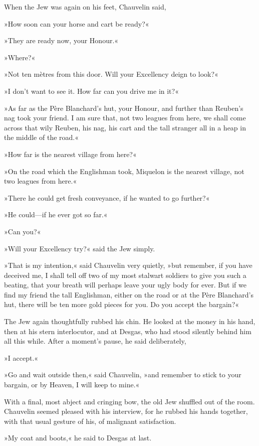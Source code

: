 When the Jew was again on his feet, Chauvelin said,\longdash


»How soon can your horse and cart be ready?«

»They are ready now, your Honour.«

»Where?«

»Not ten mètres from this door. Will your Excellency deign to look?«

»I don't want to see it. How far can you drive me in it?«

»As far as the Père Blanchard's hut, your Honour, and further than Reuben's nag took your friend. I am sure that, not two leagues from here, we shall come across that wily Reuben, his nag, his cart and the tall stranger all in a heap in the middle of the road.«

»How far is the nearest village from here?«

»On the road which the Englishman took, Miquelon is the nearest village, not two leagues from here.«

»There he could get fresh conveyance, if he wanted to go further?«

»He could—if he ever got so far.«

»Can you?«

»Will your Excellency try?« said the Jew simply.

»That is my intention,« said Chauvelin very quietly, »but remember, if you have deceived me, I shall tell off two of my most stalwart soldiers to give you such a beating, that your breath will perhaps leave your ugly body for ever. But if we find my friend the tall Englishman, either on the road or at the Père Blanchard's hut, there will be ten more gold pieces for you. Do you accept the bargain?«

The Jew again thoughtfully rubbed his chin. He looked at the money in his hand, then at his stern interlocutor, and at Desgas, who had stood silently behind him all this while. After a moment's pause, he said deliberately,\longdash


»I accept.«

»Go and wait outside then,« said Chauvelin, »and remember to stick to your bargain, or by Heaven, I will keep to mine.«

With a final, most abject and cringing bow, the old Jew shuffled out of the room. Chauvelin seemed pleased with his interview, for he rubbed his hands together, with that usual gesture of his, of malignant satisfaction.

»My coat and boots,« he said to Desgas at last.

